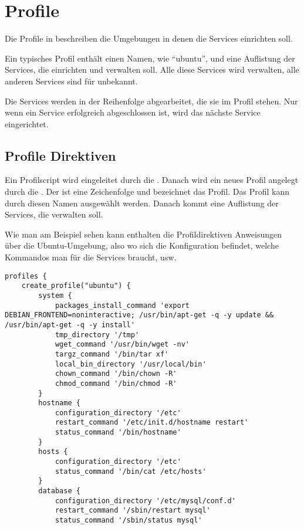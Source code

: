 \section{Profile}

\begin{multicols}{2}

Die Profile in \sscontrol{} beschreiben die Umgebungen in denen \sscontrol{} die
Services einrichten soll.

Ein typisches Profil enthält einen Namen, wie ``ubuntu'', und eine Auflistung
der Services, die \sscontrol{} einrichten und verwalten soll. Alle diese
Services wird \sscontrol{} verwalten, alle anderen Services sind für
\sscontrol{} unbekannt.

Die Services werden in der Reihenfolge abgearbeitet, die sie im Profil stehen.
Nur wenn ein Service erfolgreich abgeschlossen ist, wird das nächste Service eingerichtet.

\subsection{Profile Direktiven}

Ein Profilscript wird eingeleitet durch die .
Danach wird ein neues Profil angelegt durch die
. Der  ist eine Zeichenfolge und
bezeichnet das Profil. Das Profil kann durch diesen Namen ausgewählt werden. 
Danach kommt eine Auflistung der
Services, die \sscontrol{} verwalten soll.

Wie man am Beispiel sehen kann enthalten die Profildirektiven Anweisungen
über die Ubuntu-Umgebung, also wo sich die Konfiguration befindet, welche
Kommandos man für die Services braucht, usw.

\begin{lstlisting}[style=Java, caption=Beispiel Profil Ubuntu Server]
profiles {
	create_profile("ubuntu") {
		system {
			packages_install_command 'export DEBIAN_FRONTEND=noninteractive; /usr/bin/apt-get -q -y update && /usr/bin/apt-get -q -y install'
			tmp_directory '/tmp'
			wget_command '/usr/bin/wget -nv'
			targz_command '/bin/tar xf'
			local_bin_directory '/usr/local/bin'
			chown_command '/bin/chown -R'
			chmod_command '/bin/chmod -R'
		}
		hostname {
			configuration_directory '/etc'
			restart_command '/etc/init.d/hostname restart'
			status_command '/bin/hostname'
		}
		hosts {
			configuration_directory '/etc'
			status_command '/bin/cat /etc/hosts'
		}
		database {
			configuration_directory '/etc/mysql/conf.d'
			restart_command '/sbin/restart mysql'
			status_command '/sbin/status mysql'
			

\end{lstlisting}
\end{multicols}
